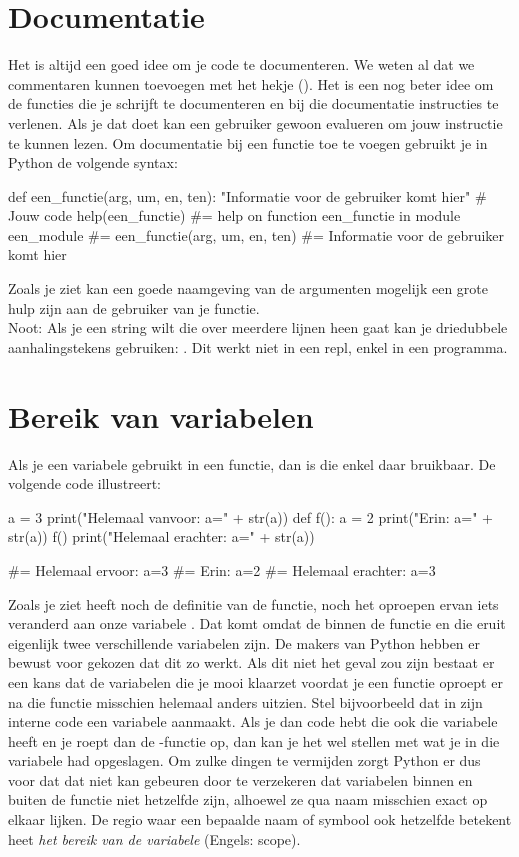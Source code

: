 \section{Documentatie}
  Het is altijd een goed idee om je code te documenteren. We weten al dat we
  commentaren kunnen toevoegen met het hekje (\py{\#}). Het is een nog beter
  idee om de functies die je schrijft te documenteren en bij die documentatie
  instructies te verlenen. Als je dat doet kan een gebruiker gewoon
   evalueren om jouw instructie te kunnen lezen. Om
  documentatie bij een functie toe te voegen gebruikt je in Python de volgende
  syntax:
  \begin{python}
    def een_functie(arg, um, en, ten):
      "Informatie voor de gebruiker komt hier"
      # Jouw code
    help(een_functie)
    #= help on function een_functie in module een_module
    #= een_functie(arg, um, en, ten)
    #=     Informatie voor de gebruiker komt hier
  \end{python}
  Zoals je ziet kan een goede naamgeving van de argumenten mogelijk een grote
  hulp zijn aan de gebruiker van je functie.\\
  Noot: Als je een string wilt die over meerdere lijnen heen gaat kan je
  driedubbele aanhalingstekens gebruiken: .
  Dit werkt  niet in een repl, enkel in een programma.
\section{Bereik van variabelen}
  Als je een variabele gebruikt in een functie, dan is die enkel daar bruikbaar.
  De volgende code illustreert:
  \begin{python}
    a = 3
    print("Helemaal vanvoor: a=" + str(a))
    def f():
      a = 2
      print("Erin: a=" + str(a))
    f()
    print("Helemaal erachter: a=" + str(a))

    #= Helemaal ervoor: a=3
    #= Erin: a=2
    #= Helemaal erachter: a=3
  \end{python}
  Zoals je ziet heeft noch de definitie van de functie, noch het oproepen ervan
  iets veranderd aan onze variabele . Dat komt omdat de  binnen de
  functie en die eruit eigenlijk twee verschillende variabelen zijn. De makers
  van Python hebben er bewust voor gekozen dat dit zo werkt. Als dit niet het
  geval zou zijn bestaat er een kans dat de variabelen die je mooi klaarzet
  voordat je een functie oproept er na die functie misschien helemaal anders
  uitzien. Stel bijvoorbeeld dat  in zijn interne code een variabele
   aanmaakt. Als je dan code hebt die ook die variabele  heeft
  en je roept dan de -functie op, dan kan je het wel stellen met wat
  je in die variabele had opgeslagen. Om zulke dingen te vermijden zorgt Python
  er dus voor dat dat niet kan gebeuren door te verzekeren dat variabelen binnen
  en buiten de functie niet hetzelfde zijn, alhoewel ze qua naam misschien exact
  op elkaar lijken. De regio waar een bepaalde naam of symbool ook hetzelfde
  betekent heet \emph{het bereik van de variabele} (Engels: scope).
